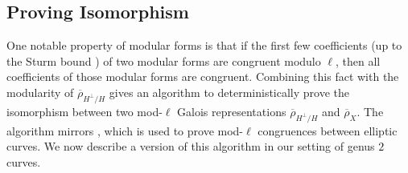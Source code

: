 \documentclass{amsproc}
\numberwithin{equation}{section}
\theoremstyle{definition}
\theoremstyle{remark}
\newcommand{\rhoHperpH}{\overline\rho_{H^\perp\!/H}}
\begin{document}
\subsection{Proving Isomorphism}
\label{subsec:irreducible}
One notable property of modular forms is that
if the first few coefficients (up to the Sturm bound \cite{original_sturm_bound}) of two modular forms are congruent modulo $\ell$, then all coefficients of those modular forms are congruent.
Combining this fact with the modularity of $\rhoHperpH$
gives an algorithm to deterministically prove the isomorphism
between two mod-$\ell$ Galois representations
$\rhoHperpH$ and $\overline\rho_X$.
The algorithm mirrors \cite[Prop.~4]{semisimplification}, which is used to prove mod-$\ell$ congruences between elliptic curves. We now describe a version of this algorithm in our setting of genus $2$ curves.
\end{document}
